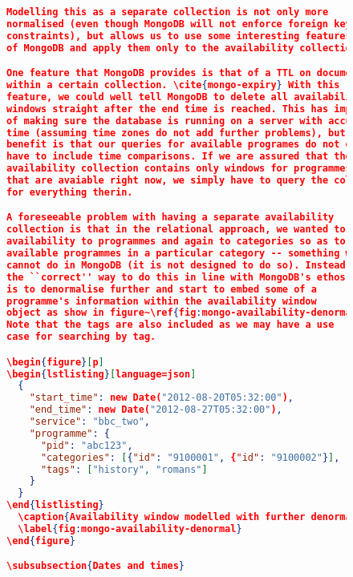 \documentclass[11pt,a4paper]{article}
\begin{document}
\begin{figure}[p]
\begin{lstlisting}[language=json]
Modelling this as a separate collection is not only more
normalised (even though MongoDB will not enforce foreign key
constraints), but allows us to use some interesting features
of MongoDB and apply them only to the availability collection.

One feature that MongoDB provides is that of a TTL on documents
within a certain collection. \cite{mongo-expiry} With this
feature, we could well tell MongoDB to delete all availability
windows straight after the end time is reached. This has implications
of making sure the database is running on a server with accurate
time (assuming time zones do not add further problems), but the
benefit is that our queries for available programes do not even
have to include time comparisons. If we are assured that the
availability collection contains only windows for programmes
that are avaiable right now, we simply have to query the collection
for everything therin.

A foreseeable problem with having a separate availability
collection is that in the relational approach, we wanted to join
availability to programmes and again to categories so as to find
available programmes in a particular category -- something we
cannot do in MongoDB (it is not designed to do so). Instead,
the ``correct'' way to do this in line with MongoDB's ethos
is to denormalise further and start to embed some of a
programme's information within the availability window
object as show in figure~\ref{fig:mongo-availability-denormal}.
Note that the tags are also included as we may have a use
case for searching by tag.

\begin{figure}[p]
\begin{lstlisting}[language=json]
  {
    "start_time": new Date("2012-08-20T05:32:00"),
    "end_time": new Date("2012-08-27T05:32:00"),
    "service": "bbc_two",
    "programme": {
      "pid": "abc123",
      "categories": [{"id": "9100001", {"id": "9100002"}],
      "tags": ["history", "romans"]
    }
  }
\end{listlisting}
  \caption{Availability window modelled with further denormalisation}
  \label{fig:mongo-availability-denormal}
\end{figure}

\subsubsection{Dates and times}


\end{lstlisting}
\end{figure}
\end{document}
